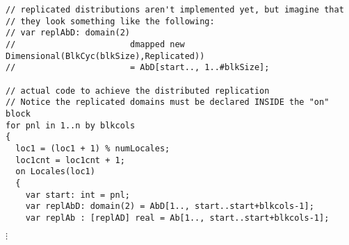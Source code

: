 {\scriptsize
\begin{verbatim}
// replicated distributions aren't implemented yet, but imagine that
// they look something like the following:
// var replAbD: domain(2)
//                       dmapped new Dimensional(BlkCyc(blkSize),Replicated))
//                       = AbD[start.., 1..#blkSize];

// actual code to achieve the distributed replication
// Notice the replicated domains must be declared INSIDE the "on" block
for pnl in 1..n by blkcols
{
  loc1 = (loc1 + 1) % numLocales;
  loc1cnt = loc1cnt + 1;
  on Locales(loc1)
  {
    var start: int = pnl;
    var replAbD: domain(2) = AbD[1.., start..start+blkcols-1];
    var replAb : [replAD] real = Ab[1.., start..start+blkcols-1];
\end{verbatim}
 $\vdots$
}